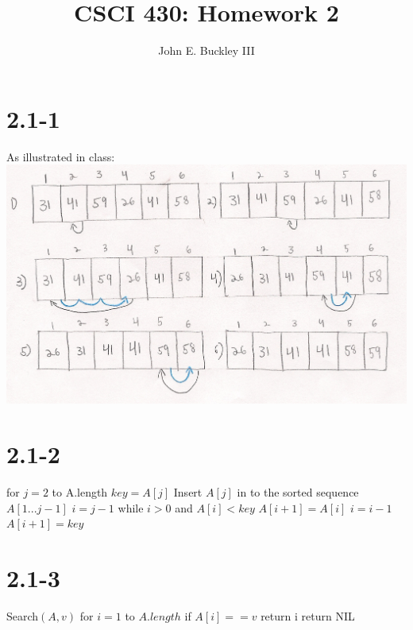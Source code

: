 \documentclass[12pt]{article}
\author{John E. Buckley III}
\title{CSCI 430: Homework 2}
\newcommand\tab[1][1cm]{\hspace*{#1}}
\begin{document}
\maketitle

\section{2.1-1}
As illustrated in class: \newline
\includegraphics[scale=.75]{scan0002}

\section{2.1-2}
for $j=2$ to A.length \newline
\tab $key=A[j]$ \newline
\tab Insert $A[j]$ in to the sorted sequence $A[1...j-1]$ \newline
\tab $i=j-1$ \newline
\tab while $i>0$ and $A[i]<key$ \newline
\tab \tab $A[i+1]=A[i]$ \newline
\tab \tab $i=i-1$ \newline
\tab $A[i+1]=key$ 

\section{2.1-3}
Search$(A, v)$ \newline
\tab for $i=1$ to $A.length$ \newline
\tab \tab if $A[i]==v$ \newline
\tab \tab \tab return i \newline
\tab return NIL \newline
\end{document}
